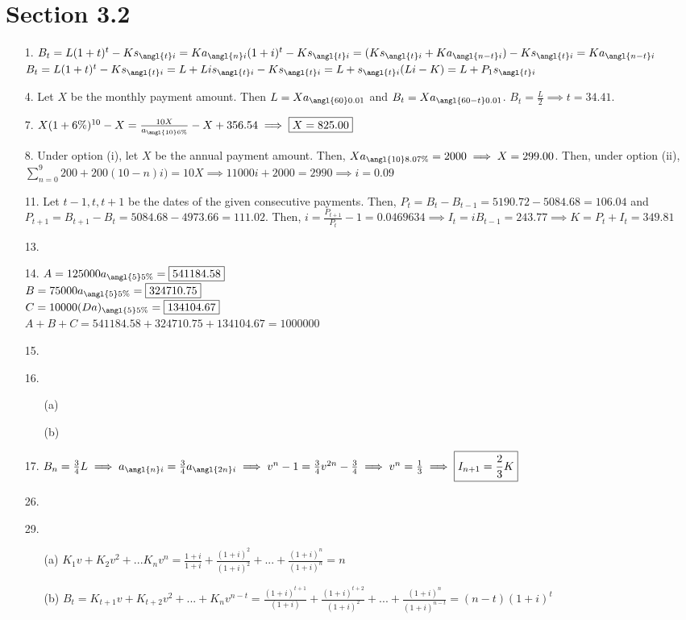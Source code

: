 \documentclass{article}
\begin{document}
\section*{Section 3.2}
\begin{itemize}
	\item [1.] $B_t=L(1+t)^t-Ks_{\angl{t}i}=Ka_{\angl{n}i}(1+i)^t-Ks_{\angl{t}i}=(Ks_{\angl{t}i}+Ka_{\angl{n-t}i})-Ks_{\angl{t}i}=Ka_{\angl{n-t}i}$\\$B_t=L(1+t)^t-Ks_{\angl{t}i}=L+Lis_{\angl{t}i}-Ks_{\angl{t}i}=L+s_{\angl{t}i}(Li-K)=L+P_1s_{\angl{t}i}$
	\item [4.] Let $X$ be the monthly payment amount. Then $L=Xa_{\angl{60}0.01}$ and $B_t=Xa_{\angl{60-t}0.01}$. $B_t=\frac{L}{2} \implies \boxed{t=34.41}$.
	\item [7.] $X(1+6\%)^{10}-X=\frac{10X}{a_{\angl{10}6\%}}-X+356.54 \implies \boxed{X=825.00}$
	\item [8.] Under option (i), let $X$ be the annual payment amount. Then, $Xa_{\angl{10}8.07\%}=2000 \implies X=299.00$. Then, under option (ii), $\sum_{n=0}^9 200+200(10-n)i)=10X \implies 11000i+2000=2990 \implies \boxed{i=0.09}$
	\item [11.] Let $t-1,t,t+1$ be the dates of the given consecutive payments. Then, $P_t=B_t-B_{t-1}=5190.72-5084.68=106.04$ and $P_{t+1}=B_{t+1}-B_t=5084.68-4973.66=111.02$. Then, $i=\frac{P_{t+1}}{P_t}-1=0.0469634 \implies I_t=iB_{t-1}=243.77 \implies K=P_t+I_t=\boxed{349.81}$
	\item [13.]
	\item [14.] $A=125000a_{\angl{5}5\%}=\boxed{541184.58}$\\$B=75000a_{\angl{5}5\%}=\boxed{324710.75}$\\$C=10000(Da)_{\angl{5}5\%}=\boxed{134104.67}$\\$A+B+C=541184.58+324710.75+134104.67=1000000$
	\item [15.]
	\item [16.]
	      \begin{itemize}
		      \item [(a)]
		      \item [(b)]
	      \end{itemize}
	\item [17.] $B_n=\frac{3}{4}L \implies a_{\angl{n}i}=\frac{3}{4}a_{\angl{2n}i} \implies v^n-1=\frac{3}{4}v^{2n}-\frac{3}{4} \implies v^n=\frac{1}{3} \implies \boxed{I_{n+1}=\frac{2}{3}K}$
	\item [26.]
	\item [29.]
	      \begin{itemize}
		      \item [(a)] $K_1v+K_2v^2+...K_nv^n=\frac{1+i}{1+i}+\frac{(1+i)^2}{(1+i)^2}+...+\frac{(1+i)^n}{(1+i)^n}=n$
		      \item [(b)] $B_t=K_{t+1}v+K_{t+2}v^2+...+K_nv^{n-t}=\frac{(1+i)^{t+1}}{(1+i)}+\frac{(1+i)^{t+2}}{(1+i)^2}+...+\frac{(1+i)^n}{(1+i)^{n-t}}=(n-t)(1+i)^t$
	      \end{itemize}
\end{itemize}
\end{document}
